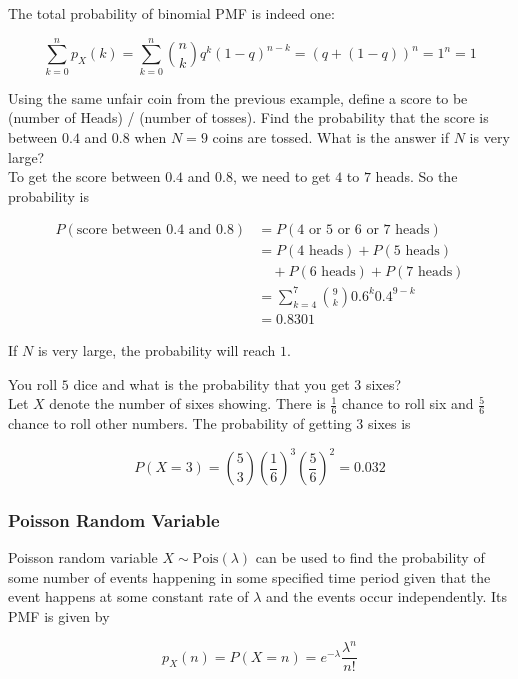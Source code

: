 \documentclass[12pt, a4paper]{article}
\newcounter{exa}
\begin{document}
The total probability of binomial PMF is indeed one:

$$\sum_{k=0}^{n} p_X(k) = \sum_{k=0}^{n} {n \choose k} q^k(1-q)^{n-k} = (q+(1-q))^n=1^n=1$$

\begin{texample}
Using the same unfair coin from the previous example, define a score to be (number of Heads) / (number of tosses). Find the probability that the score is between $0.4$ and $0.8$ when $N=9$ coins are tossed. What is the answer if $N$ is very large? \\

To get the score between $0.4$ and $0.8$, we need to get $4$ to $7$ heads. So the probability is

\begin{align*}
P(\text{score between 0.4 and 0.8})&=P(\text{4 or 5 or 6 or 7 heads}) \\
&= P(\text{4 heads})+P(\text{5 heads}) \\
&\quad + P(\text{6 heads})+P(\text{7 heads}) \\
&= \sum_{k=4}^7 \binom{9}{k}0.6^k0.4^{9-k} \\
&= 0.8301
\end{align*}

If $N$ is very large, the probability will reach $1$.
\end{texample}

\begin{texample}
You roll $5$ dice and what is the probability that you get $3$ sixes? \\

Let $X$ denote the number of sixes showing. There is $\frac16$ chance to roll six and $\frac56$ chance to roll other numbers. The probability of getting $3$ sixes is

$$P(X=3)={5\choose3}\left(\frac16\right)^3\left(\frac56\right)^2=0.032$$
\end{texample}

\subsubsection{Poisson Random Variable}

Poisson random variable $X\sim\text{Pois}(\lambda)$ can be used to find the probability of some number of events happening in some specified time period given that the event happens at some constant rate of $\lambda$ and the events occur independently. Its PMF is given by

$$p_X(n)=P(X=n)=e^{-\lambda}\frac{\lambda^n}{n!}$$
\end{document}
